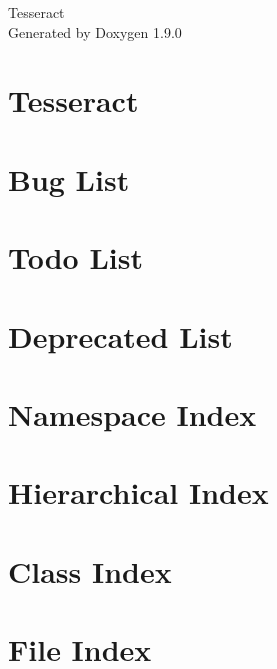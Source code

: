 \let\mypdfximage\pdfximage\def\pdfximage{\immediate\mypdfximage}\documentclass[twoside]{book}
\newcommand{\+}{\discretionary{\mbox{\scriptsize$\hookleftarrow$}}{}{}}
\newcommand{\clearemptydoublepage}{%
  \newpage{\pagestyle{empty}\cleardoublepage}%
}
\begin{document}
\raggedbottom

\hypersetup{pageanchor=false,
             bookmarksnumbered=true,
             pdfencoding=unicode
            }
\begin{titlepage}
\vspace*{7cm}
\begin{center}%
{\Large Tesseract }\\
\vspace*{1cm}
{\large Generated by Doxygen 1.9.0}\\
\end{center}
\end{titlepage}
\clearemptydoublepage
{}
\tableofcontents
\clearemptydoublepage
{}
\hypersetup{pageanchor=true}

\chapter{Tesseract}
\label{index}\hypertarget{index}{}
\chapter{Bug List}
\label{bug}

\chapter{Todo List}
\label{todo}

\chapter{Deprecated List}
\label{deprecated}

\chapter{Namespace Index}

\chapter{Hierarchical Index}

\chapter{Class Index}

\chapter{File Index}

\end{document}
